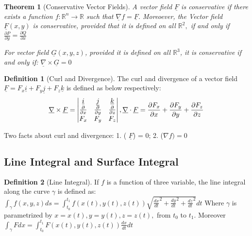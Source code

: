 \documentclass[9pt]{article}
\newtheorem{theorem}{Theorem}[subsection]
\theoremstyle{definition}
\newtheorem{definition}{Definition}[section]
\theoremstyle{remark}
\begin{document}
\begin{theorem}[Conservative Vector Fields]
A vector field $\underline{F}$ is conservative if there exists a function $f: \mathbb{R}^n \rightarrow \mathbb{R}$ such that
$\underline{\nabla} f = \underline{F}$.
Moreoever, the Vector field $ \underline{F}(x,y)$
	is conservative, provided that it is defined on all 
	$ \mathbb{R}^2,$ if and only if
	$
		\frac{\partial P}{\partial y} = \frac{\partial Q}{\partial x}
	$

For vector field $ \underline{G}(x,y,z)$, provided it is defined on all $ \mathbb{R}^3$, it is conservative if and only if:
$
	\underline{\nabla} \times \underline{G} = 0
$
\end{theorem}

\begin{definition}[Curl and Divergence]
The curl and divergence of a vector field $\underline{F} = F_x \underline{i} +  F_y \underline{j} + F_z \underline{k}$ is defined as below respectively:
\[
	\underline{\nabla} \times \underline{F} = 
	\begin{vmatrix}
		\underline{i} & \strut\underline{j} & \underline{k} \\
		\frac{\partial}{\partial x} & \frac{\partial}{\partial y} & \frac{\partial}{\partial z} \\
		F_x & F_y & F_z
	\end{vmatrix}
,
	\underline{\nabla} \cdot \underline{F} = \frac{\partial F_x}{\partial x} + \frac{\partial F_y}{\partial y} + \frac{\partial F_z}{\partial z}
\]

	Two facts about curl and divergence:
		1.  ( $\underline{F}$) = 0; 2.  ($\nabla f) = 0$

\end{definition}
\subsection{Line Integral and Surface Integral}
\begin{definition}[Line Integral]

If $f$ is a function of three variable, the line integral along the curve $\gamma$ is defined as:
$
	\int_\gamma f(x,y,z) ds 
	= \int_{t_0} ^{t_1} f(x(t), y(t), z(t)) \sqrt{ \frac{dx}{dt}^2 + \frac{dy}{dt}^2 + \frac{dz}{dt}^2 } dt
$
Where $\gamma$ is parametrized by $x=x(t), y=y(t), z=z(t),$ from $t_0$ to $t_1$.
Moreover
$
	\int_\gamma F dx = \int_{t_0} ^{t_1} F(x(t), y(t), z(t)) \frac{dx}{dt} dt
$
\end{definition}
\end{document}
